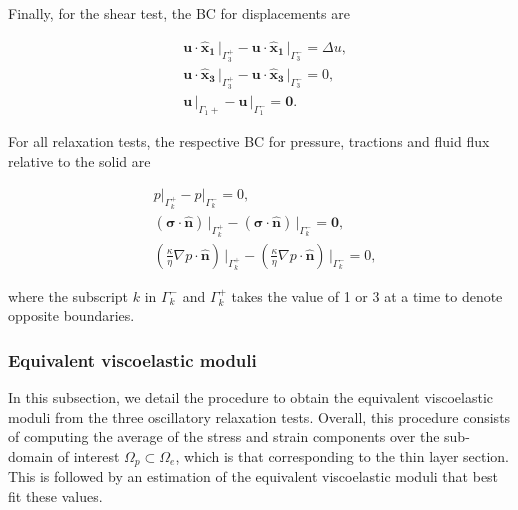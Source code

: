 \documentclass[draft]{agujournal2019}
\begin{document}
Finally, for the shear test, the BC for displacements are
\begin{linenomath*}
\begin{equation}\label{Eq.10}
\begin{split}
& \bm{u} \cdot \bm{\hat{x}_1}\,\vert_{\Gamma_3^+}- \bm{u} \cdot \bm{\hat{x}_1} \,\vert_{\Gamma_3^-} =\Delta u,\\
& \bm{u} \cdot \bm{\hat{x}_3}\,\vert_{\Gamma_3^+}- \bm{u} \cdot \bm{\hat{x}_3}\,\vert_{\Gamma_3^-} = 0, \\
& \bm{u}\,\vert_{\Gamma_1+}- \bm{u}\,\vert_{\Gamma_1^-} =\bm{0}.
\end{split}
\end{equation}
\end{linenomath*}

For all relaxation tests, the respective BC for pressure, tractions and fluid flux relative to the solid are
\begin{linenomath*}
\begin{equation}\label{Eq.11}
\begin{split}
& p\vert_{\Gamma_k^+}-p\vert_{\Gamma_k^-} =0, \\
& \left(\bm{\sigma}\cdot \bm{\hat n} \right)\, \vert_{\Gamma_k^+}-\left(\bm{\sigma}\cdot \bm{\hat n} \right)\, \vert_{\Gamma_k^-} = \bm{0},\\
&\left( \frac{\kappa}{\eta} \nabla p \cdot \bm{\hat n} \right) \, \vert_{\Gamma_k^+} -\left( \frac{\kappa}{\eta} \nabla p \cdot \bm{\hat n} \right) \, \vert_{\Gamma_k^-} = 0,
\end{split}
\end{equation}
\end{linenomath*}
where the subscript $k$ in $\Gamma_k^-$ and $\Gamma_k^+$ takes the value of 1 or 3 at a time to denote opposite boundaries.

\subsubsection{Equivalent viscoelastic moduli}
In this subsection, we detail the procedure to obtain the equivalent viscoelastic moduli from the three oscillatory relaxation tests. Overall, this procedure consists of computing the average of the  stress and strain components over the sub-domain of interest $\Omega_p \subset \Omega_e$, which is that corresponding to the thin layer section. This is followed by an estimation of the equivalent viscoelastic moduli that best fit these values. 
\end{document}
